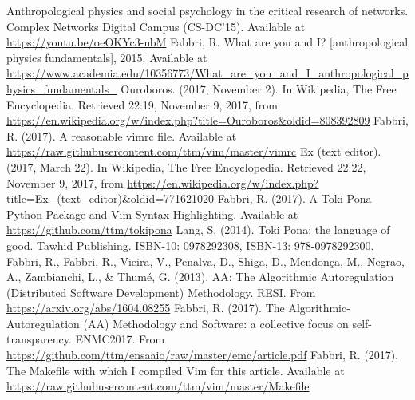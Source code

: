 \documentclass{article}
\begin{document}
\begin{thebibliography}{99}
\fontsize{11}{0}\selectfont
{}
	Anthropological physics and social psychology in the critical research of networks. Complex Networks Digital Campus (CS-DC'15).
	Available at \url{https://youtu.be/oeOKYc3-nbM}
	Fabbri, R. What are you and I? [anthropological physics fundamentals], 2015. Available at \url{https://www.academia.edu/10356773/What_are_you_and_I_anthropological_physics_fundamentals_}
  Ouroboros. (2017, November 2). In Wikipedia, The Free Encyclopedia. Retrieved 22:19, November 9, 2017, from \url{https://en.wikipedia.org/w/index.php?title=Ouroboros&oldid=808392809}
	Fabbri, R. (2017). A reasonable vimrc file. Available at \url{https://raw.githubusercontent.com/ttm/vim/master/vimrc} 
  Ex (text editor). (2017, March 22). In Wikipedia, The Free Encyclopedia. Retrieved 22:22, November 9, 2017, from \url{https://en.wikipedia.org/w/index.php?title=Ex_(text_editor)&oldid=771621020}
	Fabbri, R. (2017). A Toki Pona Python Package and Vim Syntax Highlighting. Available at \url{https://github.com/ttm/tokipona} 
	Lang, S. (2014). Toki Pona: the language of good. Tawhid Publishing.
    ISBN-10: 0978292308, ISBN-13: 978-0978292300.
	Fabbri, R., Fabbri, R., Vieira, V., Penalva, D., Shiga, D., Mendonça, M., Negrao, A., Zambianchi, L., \& Thumé, G. (2013). AA: The Algorithmic Autoregulation (Distributed Software Development) Methodology. RESI. From \url{https://arxiv.org/abs/1604.08255}
	Fabbri, R. (2017).
The Algorithmic-Autoregulation (AA) Methodology and Software:
a collective focus on self-transparency. ENMC2017. From \url{https://github.com/ttm/ensaaio/raw/master/emc/article.pdf} 
	Fabbri, R. (2017). The Makefile with which I compiled Vim for this article. Available at \url{https://raw.githubusercontent.com/ttm/vim/master/Makefile} 
\end{thebibliography}
\end{document}
